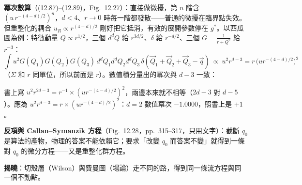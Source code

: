 \textbf{冪次數算}（(12.87)--(12.89)，Fig.~12.27）：直接做微擾，第 $n$ 階含 $(u\,r^{-(4-d)/2})^n$，$d<4$、$r\to0$ 時每一階都發散——普通的微擾在臨界點失效。
但重整化的耦合 $u_R\propto r^{(4-d)/2}$ 剛好把它抵消，有效的展開參數停在 $g^*$。以西瓜圖為例：特徵動量 $Q\propto r^{1/2}$，三個 $d^dQ$ 給 $r^{3d/2}$、$\delta$ 給 $r^{-d/2}$、三個 $G=\frac1{r+Q^2}$ 給 $r^{-3}$：
\[\int u^2G(Q_1)G(Q_2)G(Q_3)\,d^dQ_1d^dQ_2d^dQ_3\,\delta(\vec Q_1+\vec Q_2+\vec Q_3-\vec q)\ \propto\ u^2r^{d-3}=r\,\big(ur^{-(4-d)/2}\big)^2\tag{12.89}\]
（$\Sigma$ 和 $r$ 同單位，所以前面是 $r$）。數值積分量出的冪次與 $d-3$ 一致：
\begin{center}\footnotesize\setlength{\tabcolsep}{5pt}\TwelveTabPc\end{center}
\begin{errbox}[p.~315，(12.89) 後]
書上寫 $u^2r^{2d-3}=r^{-1}\times(ur^{-(4-d)/2})^2$，兩邊本來就不相等（$2d-3$ 對 $d-5$）。應為 $u^2r^{d-3}=r\times(ur^{-(4-d)/2})^2$：$d=2$ 數值冪次 $-1.0000$，照書上是 $+1$。
\end{errbox}
\textbf{反項與 Callan--Symanzik 方程}（Fig.~12.28，pp.~315--317，只用文字）：截斷 $q_0$ 是算法的產物，物理的答案不能依賴它；要求「改變 $q_0$ 而答案不變」就得到一條對 $q_0$ 的微分方程——又是重整化群方程。

\textbf{揭曉}：切殼層（Wilson）與費曼圖（場論）走不同的路，得到同一條流方程與同一個不動點。

